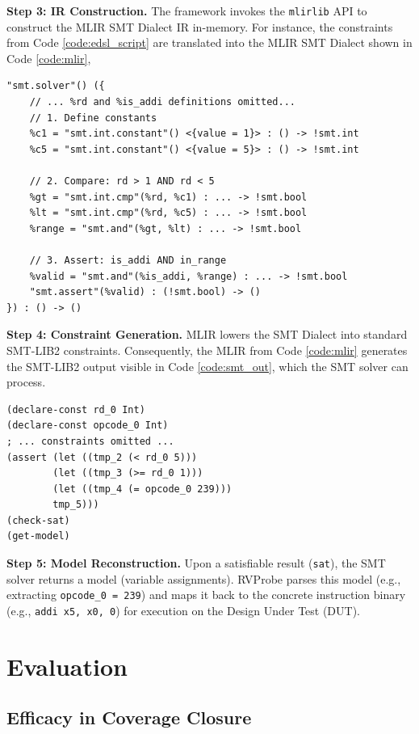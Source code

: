 \documentclass[sigconf]{acmart}
\begin{document}
\textbf{Step 3: IR Construction.} The framework invokes the \texttt{mlirlib} API to construct the MLIR SMT Dialect IR in-memory. For instance, the constraints from Code \ref{code:edsl_script} are translated into the MLIR SMT Dialect shown in Code \ref{code:mlir},

\begin{lstlisting}[caption={Simplified MLIR SMT Dialect Generation}, label=code:mlir] 
"smt.solver"() ({
    // ... %rd and %is_addi definitions omitted...
    // 1. Define constants 
    %c1 = "smt.int.constant"() <{value = 1}> : () -> !smt.int 
    %c5 = "smt.int.constant"() <{value = 5}> : () -> !smt.int
    
    // 2. Compare: rd > 1 AND rd < 5 
    %gt = "smt.int.cmp"(%rd, %c1) : ... -> !smt.bool 
    %lt = "smt.int.cmp"(%rd, %c5) : ... -> !smt.bool 
    %range = "smt.and"(%gt, %lt) : ... -> !smt.bool
    
    // 3. Assert: is_addi AND in_range 
    %valid = "smt.and"(%is_addi, %range) : ... -> !smt.bool 
    "smt.assert"(%valid) : (!smt.bool) -> () 
}) : () -> () 
\end{lstlisting}

\textbf{Step 4: Constraint Generation.} MLIR lowers the SMT Dialect into standard SMT-LIB2 constraints. Consequently, the MLIR from Code \ref{code:mlir} generates the SMT-LIB2 output visible in Code \ref{code:smt_out}, which the SMT solver can process.
\begin{lstlisting}[caption={Generated SMT-LIB2 Constraints}, label=code:smt_out]
(declare-const rd_0 Int)
(declare-const opcode_0 Int)
; ... constraints omitted ...
(assert (let ((tmp_2 (< rd_0 5)))
        (let ((tmp_3 (>= rd_0 1)))
        (let ((tmp_4 (= opcode_0 239)))
        tmp_5)))
(check-sat)
(get-model)
\end{lstlisting}

\textbf{Step 5: Model Reconstruction.} Upon a satisfiable result (\texttt{sat}), the SMT solver returns a model (variable assignments). RVProbe parses this model (e.g., extracting \texttt{opcode\_0 = 239}) and maps it back to the concrete instruction binary (e.g., \texttt{addi x5, x0, 0}) for execution on the Design Under Test (DUT).

\section{Evaluation}\label{Sec4}

\subsection{Efficacy in Coverage Closure}
\end{document}
